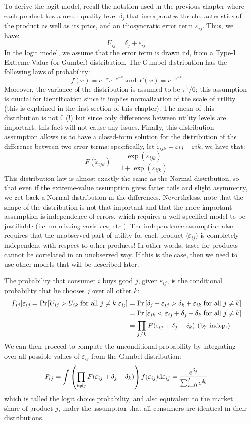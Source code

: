 To derive the logit model, recall the notation used in the previous chapter where each product has a mean quality level $\delta_j$ that incorporates the characteristics of the product as well as its price, and an idiosyncratic error term $\varepsilon_{ij}$. Thus, we have: $$ U_{ij} = \delta_j + \varepsilon_{ij} $$ In the logit model, we assume that the error term is drawn iid, from a Type-I Extreme Value (or Gumbel) distribution. The Gumbel distribution has the following laws of probability: $$ f(x) = e^{-x}e^{-e^{-x}} \text{ and } F(x) = e^{-e^{-x}} $$ Moreover, the variance of the distribution is assumed to be $\pi^2/6$; this assumption is crucial for identification since it implies normalization of the scale of utility (this is explained in the first section of this chapter). The mean of this distribution is not 0 (!) but since only differences between utility levels are important, this fact will not cause any issues. Finally, this distribution assumption allows us to have a closed-form solution for the distribution of the difference between two error terms: specifically, let $\tilde \varepsilon_{ijk} = \varepsilon{ij} - \varepsilon{ik}$, we have that: $$ F(\tilde \varepsilon_{ijk}) = \frac{\exp(\tilde \varepsilon_{ijk})}{1 + \exp(\tilde \varepsilon_{ijk})} $$ This distribution law is almost exactly the same as the Normal distribution, so that even if the extreme-value assumption gives fatter tails and slight asymmetry, we get back a Normal distribution in the differences. Nevertheless, note that the shape of the distribution is not that important and that the more important assumption is independence of errors, which requires a well-specified model to be justifiable (i.e. no missing variables, etc.). The independence assumption also requires that the unobserved part of utility for each product ($\varepsilon_{ij}$) is completely independent with respect to other products! In other words, taste for products cannot be correlated in an unobserved way. If this is the case, then we need to use other models that will be described later.

The probability that consumer $i$ buys good $j$, given $\varepsilon_{ij}$, is the conditional probability that he chooses $j$ over all other $k$: \begin{align*} P_{ij}|\varepsilon_{ij} = \operatorname{Pr}\left[U_{ij}>U_{ik}\text{ for all } j\neq k | \varepsilon_{ij} \right] & = \operatorname{Pr}\left[\delta_j + \varepsilon_{ij} >\delta_k + \varepsilon_{ik}\text{ for all } j\neq k\right] \\
& = \operatorname{Pr}\left[ \varepsilon_{ik} < \varepsilon_{ij} + \delta_j - \delta_k \text{ for all } j\neq k \right] \\
& = \prod_{j\neq k} F(\varepsilon_{ij} + \delta_j - \delta_k) \text{ (by indep.)}
\end{align*}
We can then proceed to compute the unconditional probability by integrating over all possible values of $\varepsilon_{ij}$ from the Gumbel distribution: $$ P_{ij} = \int \left(\prod_{k\neq j} F(\varepsilon_{ij} + \delta_j - \delta_k)\right) f(\varepsilon_{ij})\mathrm{d}\varepsilon_{ij} = \frac{ e^{\delta_{j}} }{ \sum_{k=0}^{J} e^{\delta_{k}} } $$ which is called the logit choice probability, and also equivalent to the market share of product $j$, under the assumption that all consumers are identical in their distributions.

